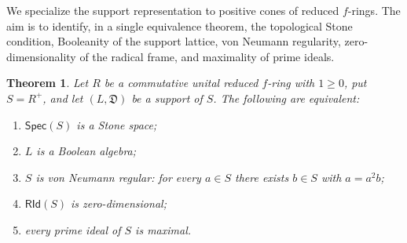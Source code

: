 \documentclass[12pt,leqno]{amsart}
\newcommand{\Spec}{\mathsf{Spec}}
\newcommand{\RId}{\mathsf{RId}}
\newtheorem{theorem}{Theorem}[section]
\theoremstyle{definition}
\numberwithin{equation}{section}
\theoremstyle{remark}
\begin{document}
We specialize the support representation to positive cones of reduced $f$-rings. The aim is to identify, in a single equivalence theorem, the topological Stone condition, Booleanity of the support lattice, von Neumann regularity, zero-dimensionality of the radical frame, and maximality of prime ideals.

\begin{theorem}\label{thm:stone-spectrum-criterion}
Let $R$ be a commutative unital reduced $f$-ring with \(1\geq0\), put \(S=R^+\), and let \((L,\mathfrak D)\) be a support of $S$. The following are equivalent:
\begin{enumerate}
\item \(\Spec(S)\) is a Stone space;
\item $L$ is a Boolean algebra;
\item $S$ is von Neumann regular: for every \(a\in S\) there exists \(b\in S\) with \(a=a^2b\);
\item \(\RId(S)\) is zero-dimensional;
\item every prime ideal of $S$ is maximal.
\end{enumerate}
\end{theorem}
\end{document}
